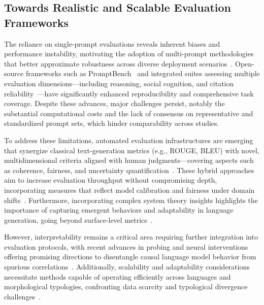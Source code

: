 \documentclass[sigconf]{acmart}
\begin{document}
\subsection{Towards Realistic and Scalable Evaluation Frameworks}

The reliance on single-prompt evaluations reveals inherent biases and performance instability, motivating the adoption of multi-prompt methodologies that better approximate robustness across diverse deployment scenarios~\cite{ref25}. Open-source frameworks such as PromptBench~\cite{ref11} and integrated suites assessing multiple evaluation dimensions—including reasoning, social cognition, and citation reliability~\cite{ref17,ref21}—have significantly enhanced reproducibility and comprehensive task coverage. Despite these advances, major challenges persist, notably the substantial computational costs and the lack of consensus on representative and standardized prompt sets, which hinder comparability across studies.

To address these limitations, automated evaluation infrastructures are emerging that synergize classical text-generation metrics (e.g., ROUGE, BLEU) with novel, multidimensional criteria aligned with human judgments—covering aspects such as coherence, fairness, and uncertainty quantification~\cite{ref31,ref39}. These hybrid approaches aim to increase evaluation throughput without compromising depth, incorporating measures that reflect model calibration and fairness under domain shifts~\cite{ref41}. Furthermore, incorporating complex system theory insights highlights the importance of capturing emergent behaviors and adaptability in language generation, going beyond surface-level metrics~\cite{ref25}.

However, interpretability remains a critical area requiring further integration into evaluation protocols, with recent advances in probing and neural interventions offering promising directions to disentangle causal language model behavior from spurious correlations~\cite{ref36}. Additionally, scalability and adaptability considerations necessitate methods capable of operating efficiently across languages and morphological typologies, confronting data scarcity and typological divergence challenges~\cite{ref38}.
\end{document}
